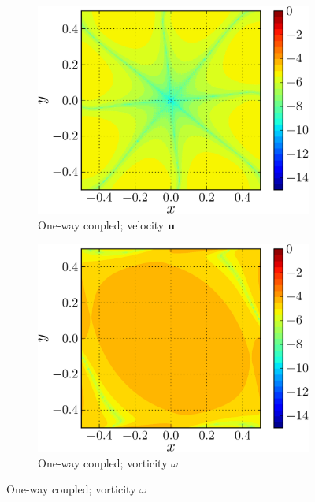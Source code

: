 \begin{figure}[!b]
     \begin{subfigure}[t]{0.45\textwidth}
             \includegraphics[width=\linewidth]{./figures/hybrid/lambOseent2/lambOseen_oneway_vErrorFinal_compressed-crop.png}
             \caption{One-way coupled; velocity $\mathbf{u}$}
             \label{fig:lambOseen_oneway_vErrorFinal}
     \end{subfigure}
     \qquad
     \begin{subfigure}[t]{0.45\textwidth}
             \includegraphics[width=\linewidth]{./figures/hybrid/lambOseent2/lambOseen_oneway_wErrorFinal_compressed-crop.png}
             \caption{One-way coupled; vorticity $\omega$}
             \label{fig:lambOseen_oneway_wErrorFinal}
     \end{subfigure}     
   

\end{figure}
